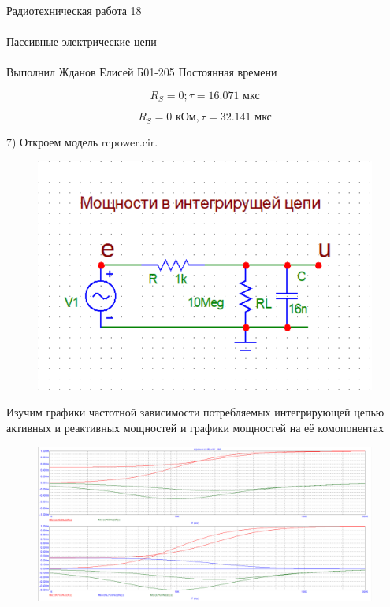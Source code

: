 \documentclass{astroedu-lab}
\begin{document}
\begin{problem}{\huge Радиотехническая работа 18\\\\Пассивные электрические цепи\\\\Выполнил Жданов Елисей Б01-205}
Постоянная времени

\begin{equation}
	R_S = 0; \tau = 16.071\text{ мкс}
\end{equation}

\begin{equation}
	R_S = 0 \text{ кОм}, \tau = 32.141\text{ мкс}
\end{equation}

7) Откроем модель rcpower.cir. 

\begin{figure}[!h]
	\centering
	\includegraphics[width=1\textwidth]{1_11.png}
	\label{fig:boiler}
\end{figure}

\newpage

Изучим графики частотной зависимости потребляемых интегрирующей цепью активных и реактивных мощностей и графики мощностей на её комопонентах

\begin{figure}[!h]
	\centering
	\includegraphics[width=1\textwidth]{1_12.png}
	\label{fig:boiler}
\end{figure}


\end{problem}
\end{document}

